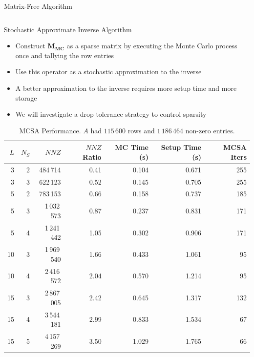 \documentclass{beamer}
\begin{document}
\begin{frame}{Matrix-Free Algorithm}
\begin{columns}
\begin{column}{0.6\textwidth}
    \end{column}
  \end{columns}
  
\end{frame}

\begin{frame}{Stochastic Approximate Inverse Algorithm}

  \vspace{-0.1in}
  
  \begin{itemize}
    \small
    \item Construct $\mathbf{M_{MC}}$ as a sparse matrix by executing the
      Monte Carlo process once and tallying the row entries
    \item Use this operator as a stochastic approximation to the inverse
    \item A better approximation to the inverse requires more setup time and
      more storage
    \item We will investigate a drop tolerance strategy to control sparsity
  \end{itemize}

  \vspace{-0.1in}

  \begin{table}[htb!]
    \tiny
    \begin{center}
      \begin{tabular}{rrrrrrr}
        \toprule
        \multicolumn{1}{r}{$L$} &
        \multicolumn{1}{r}{$N_S$} &
        \multicolumn{1}{r}{$NNZ$} &
        \multicolumn{1}{r}{$NNZ$ Ratio} &
        \multicolumn{1}{r}{MC Time (s)} &
        \multicolumn{1}{r}{Setup Time (s)} &
        \multicolumn{1}{r}{MCSA Iters}
        \\ \midrule
        3 & 2 & 484\,714 & 0.41 & 0.104 & 0.671 & 255 \\
        3 & 3 & 622\,123 & 0.52 & 0.145 & 0.705 & 255 \\
        5 & 2 & 783\,153 & 0.66 & 0.158 & 0.737 & 185 \\
        5 & 3 & 1\,032\,573 & 0.87 & 0.237 & 0.831 & 171 \\
        5 & 4 & 1\,241\,442 & 1.05 & 0.302 & 0.906 & 171 \\
        10 & 3 & 1\,969\,540 & 1.66 & 0.433 & 1.061 & 95 \\
        10 & 4 & 2\,416\,572 & 2.04 & 0.570 & 1.214 & 95 \\
        15 & 3 & 2\,867\,005 & 2.42 & 0.645 & 1.317 & 132 \\
        15 & 4 & 3\,544\,181 & 2.99 & 0.833 & 1.534 & 67 \\
        15 & 5 & 4\,157\,269 & 3.50 & 1.029 & 1.765 & 66 \\
        \bottomrule
      \end{tabular}
    \end{center}
    \caption{MCSA Performance. $A$ had $115\,600$ rows and $1\,186\,464$ non-zero
      entries.}
  \end{table} 


\end{frame}
\end{document}
